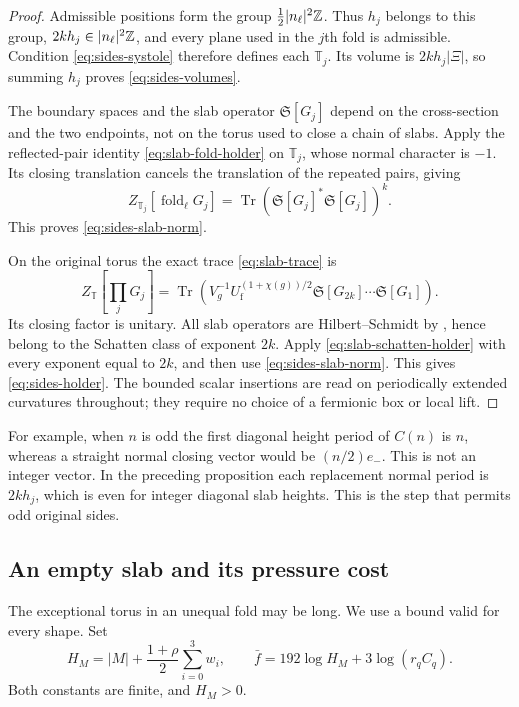 \begin{proof}
Admissible positions form the group
$\frac12|n_\ell|^2\mathbb Z$. Thus $h_j$ belongs to this group,
$2kh_j\in|n_\ell|^2\mathbb Z$, and every plane used in the $j$th fold
is admissible. Condition \eqref{eq:sides-systole} therefore defines
each $\mathbb T_j$. Its volume is $2kh_j|\Xi|$, so summing
$h_j$ proves \eqref{eq:sides-volumes}.

The boundary spaces and the slab operator $\mathfrak S[G_j]$ depend
on the cross-section and the two endpoints, not on the torus used
to close a chain of slabs. Apply the reflected-pair identity
\eqref{eq:slab-fold-holder} on $\mathbb T_j$, whose normal character
is $-1$. Its closing translation cancels the translation of the
repeated pairs, giving
\[
 Z_{\mathbb T_j}[\operatorname{fold}_\ell G_j]
   =\operatorname{Tr}
       (\mathfrak S[G_j]^*\mathfrak S[G_j])^k.
\]
This proves \eqref{eq:sides-slab-norm}.

On the original torus the exact trace \eqref{eq:slab-trace} is
\[
 Z_{\mathbb T}\left[\prod_jG_j\right]
  =\operatorname{Tr}\left(
     V_g^{-1}U_{\mathrm f}^{(1+\chi(g))/2}
     \mathfrak S[G_{2k}]\cdots\mathfrak S[G_1]\right).
\]
Its closing factor is unitary. All slab operators are
Hilbert--Schmidt by , hence belong
to the Schatten class of exponent $2k$. Apply
\eqref{eq:slab-schatten-holder} with every exponent equal to $2k$,
and then use \eqref{eq:sides-slab-norm}. This gives
\eqref{eq:sides-holder}. The bounded scalar insertions are read on
periodically extended curvatures throughout; they require no choice
of a fermionic box or local lift.
\end{proof}

For example, when $n$ is odd the first diagonal height period of
$C(n)$ is $n$, whereas a straight normal closing vector would be
$(n/2)e_-$. This is not an integer vector. In the preceding proposition
each replacement normal period is $2kh_j$, which is even for integer
diagonal slab heights. This is the step that permits odd original sides.

\subsection{An empty slab and its pressure cost}\label{sec:empty-slab}

The exceptional torus in an unequal fold may be long. We use a bound
valid for every shape. Set
\begin{equation}\label{eq:sides-constants}
 H_M=|M|+\frac{1+\rho}{2}\sum_{i=0}^3w_i,
 \qquad \bar f=192\log H_M+3\log(r_qC_q).
\end{equation}
Both constants are finite, and $H_M>0$.

